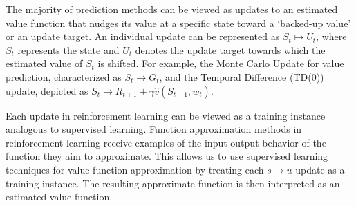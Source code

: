 The majority of prediction methods can be viewed as updates to an estimated value function that nudges its value at a specific state toward a `backed-up value' or an update target. An individual update can be represented as $S_t \mapsto U_t$, where $S_t$ represents the state and $U_t$ denotes the update target towards which the estimated value of $S_t$ is shifted. For example, the Monte Carlo Update for value prediction, characterized as $S_t \to G_t$, and the Temporal Difference (TD(0)) update, depicted as $S_t \to R_{t+1} + \gamma \hat{v}(S_{t+1},w_{t})$.


Each update in reinforcement learning can be viewed as a training instance analogous to supervised learning. Function approximation methods in reinforcement learning receive examples of the input-output behavior of the function they aim to approximate. This allows us to use supervised learning techniques for value function approximation by treating each $s \to u$ update as a training instance. The resulting approximate function is then interpreted as an estimated value function.

